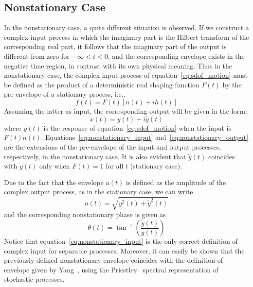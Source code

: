 \documentclass[12pt]{article}
\begin{document}
\subsection{Nonstationary Case}
In the nonstationary case, a quite different situation is observed. If we construct a complex input process in which the imaginary part is the Hilbert transform of the corresponding real part, it follows that the imaginary part of the output is different from zero for $-\infty < t < 0$, and the corresponding envelope exists in the negative time region, in contrast with its own physical meaning. Thus in the nonstationary case, the complex input process of equation~\eqref{eq:sdof_motion} must be defined as the product of a deterministic real shaping function $F(t)$ by the pre-envelope of a stationary process, i.e.,
\begin{equation}
    f(t) = F(t) [n(t) + i h(t)]
    \label{eq:nonstationary_input}
\end{equation}
Assuming the latter as input, the corresponding output will be given in the form:
\begin{equation}
    x(t) = y(t) + i \tilde{y}(t)
    \label{eq:nonstationary_output}
\end{equation}
where $y(t)$ is the response of equation~\eqref{eq:sdof_motion} when the input is $F(t) n(t)$. Equations~\eqref{eq:nonstationary_input} and~\eqref{eq:nonstationary_output} are the extensions of the pre-envelope of the input and output processes, respectively, in the nonstationary case. It is also evident that $\tilde{y}(t)$ coincides with $\tilde{y}(t)$ only when $F(t) = 1$ for all $t$ (stationary case).

Due to the fact that the envelope $a(t)$ is defined as the amplitude of the complex output process, as in the stationary case, we can write
\begin{equation}
    a(t) = \sqrt{y^2(t) + \tilde{y}^2(t)}
    \label{eq:nonstationary_envelope}
\end{equation}
and the corresponding nonstationary phase is given as
\begin{equation}
    \theta(t) = \tan^{-1} \left( \frac{\tilde{y}(t)}{y(t)} \right)
    \label{eq:nonstationary_phase}
\end{equation}
Notice that equation~\eqref{eq:nonstationary_input} is the only correct definition of complex input for separable processes. Moreover, it can easily be shown that the previously defined nonstationary envelope coincides with the definition of envelope given by Yang~\cite{yang1972}, using the Priestley~\cite{priestley1967} spectral representation of stochastic processes.
\end{document}
